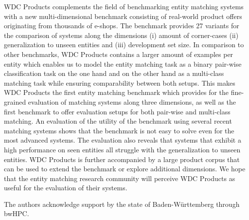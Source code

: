 \documentclass[sigconf,edbt]{acmart-edbt2024}
\begin{document}
WDC Products complements the field of benchmarking entity matching systems with a new multi-dimensional benchmark consisting of real-world product offers originating from thousands of e-shops. The benchmark provides 27 variants for the comparison of systems along the dimensions (i) amount of corner-cases (ii) generalization to unseen entities and (iii) development set size. In comparison to other benchmarks, WDC Products contains a larger amount of examples per entity which enables us to model the entity matching task as a binary pair-wise classification task on the one hand and on the other hand as a multi-class matching task while ensuring comparability between both setups. 
This makes WDC Products the first entity matching benchmark which provides for the fine-grained evaluation of matching systems along three dimensions, as well as the first benchmark to offer evaluation setups for both pair-wise and multi-class matching.
An evaluation of the utility of the benchmark using several recent matching systems shows that the benchmark is not easy to solve even for the most advanced systems. The evaluation also reveals that systems that exhibit a high performance on seen entities all struggle with the generalization to unseen entities. WDC Products is further accompanied by a large product corpus that can be used to extend the benchmark or explore additional dimensions.
We hope that the entity matching research community will perceive WDC Products as useful for the evaluation of their systems. 

\begin{acks}
The authors acknowledge support by the state of Baden-Württemberg through bwHPC.
\end{acks}




\end{document}
